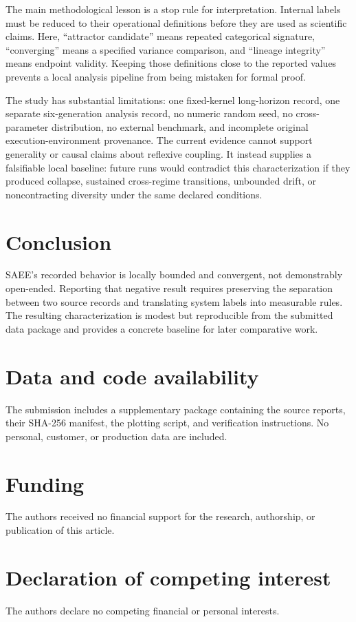 \documentclass[12pt]{article}
\begin{document}
The main methodological lesson is a stop rule for interpretation. Internal
labels must be reduced to their operational definitions before they are used
as scientific claims. Here, ``attractor candidate'' means repeated categorical
signature, ``converging'' means a specified variance comparison, and
``lineage integrity'' means endpoint validity. Keeping those definitions close
to the reported values prevents a local analysis pipeline from being mistaken
for formal proof.

The study has substantial limitations: one fixed-kernel long-horizon record,
one separate six-generation analysis record, no numeric random seed, no
cross-parameter distribution, no external benchmark, and incomplete original
execution-environment provenance. The current evidence cannot support
generality or causal claims about reflexive coupling. It instead supplies a
falsifiable local baseline: future runs would contradict this characterization
if they produced collapse, sustained cross-regime transitions, unbounded drift,
or noncontracting diversity under the same declared conditions.

\section{Conclusion}

SAEE's recorded behavior is locally bounded and convergent, not demonstrably
open-ended. Reporting that negative result requires preserving the separation
between two source records and translating system labels into measurable
rules. The resulting characterization is modest but reproducible from the
submitted data package and provides a concrete baseline for later comparative
work.

\section*{Data and code availability}
The submission includes a supplementary package containing the source reports,
their SHA-256 manifest, the plotting script, and verification instructions.
No personal, customer, or production data are included.

\section*{Funding}
The authors received no financial support for the research, authorship, or
publication of this article.

\section*{Declaration of competing interest}
The authors declare no competing financial or personal interests.
\end{document}
